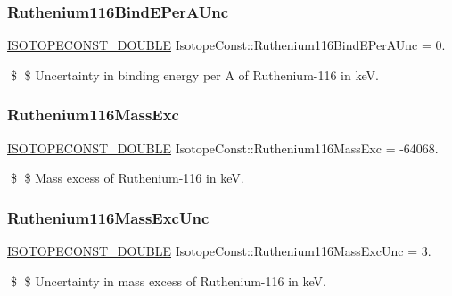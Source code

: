 \subsubsection{\texorpdfstring{Ruthenium116\+Bind\+E\+Per\+A\+Unc}{Ruthenium116BindEPerAUnc}}
{\footnotesize\ttfamily \mbox{\hyperlink{group___isotope_const-_macros_ga8f45a7272ce02c0b4c65c44636ed719a}{I\+S\+O\+T\+O\+P\+E\+C\+O\+N\+S\+T\+\_\+\+D\+O\+U\+B\+LE}} Isotope\+Const\+::\+Ruthenium116\+Bind\+E\+Per\+A\+Unc = 0.}

\$ \$ Uncertainty in binding energy per A of Ruthenium-\/116 in keV. \mbox{\label{group___isotope_const-_ruthenium-_ru116_ga0222b36f86c37ecb3cae0e6e3cde6cd3}} 
\subsubsection{\texorpdfstring{Ruthenium116\+Mass\+Exc}{Ruthenium116MassExc}}
{\footnotesize\ttfamily \mbox{\hyperlink{group___isotope_const-_macros_ga8f45a7272ce02c0b4c65c44636ed719a}{I\+S\+O\+T\+O\+P\+E\+C\+O\+N\+S\+T\+\_\+\+D\+O\+U\+B\+LE}} Isotope\+Const\+::\+Ruthenium116\+Mass\+Exc = -\/64068.}

\$ \$ Mass excess of Ruthenium-\/116 in keV. \mbox{\label{group___isotope_const-_ruthenium-_ru116_ga3a5370321cb8f76c7578a0c1cc44ba3b}} 
\subsubsection{\texorpdfstring{Ruthenium116\+Mass\+Exc\+Unc}{Ruthenium116MassExcUnc}}
{\footnotesize\ttfamily \mbox{\hyperlink{group___isotope_const-_macros_ga8f45a7272ce02c0b4c65c44636ed719a}{I\+S\+O\+T\+O\+P\+E\+C\+O\+N\+S\+T\+\_\+\+D\+O\+U\+B\+LE}} Isotope\+Const\+::\+Ruthenium116\+Mass\+Exc\+Unc = 3.}

\$ \$ Uncertainty in mass excess of Ruthenium-\/116 in keV. \mbox{\label{group___isotope_const-_ruthenium-_ru116_ga278eb228750bd4c36424c0814beeaeea}} 

